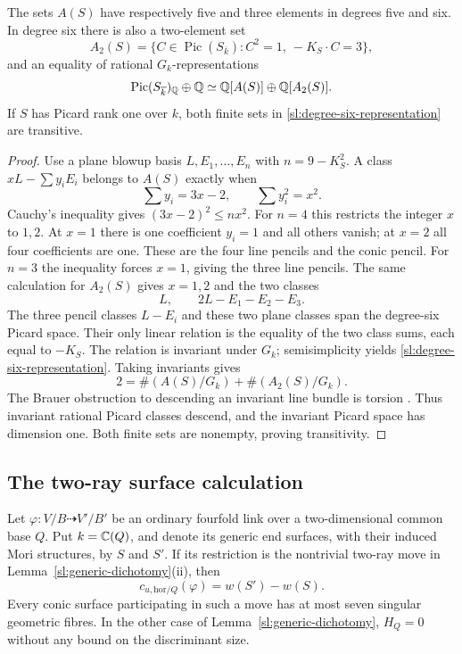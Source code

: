 \begin{lemma}\label{sl:pencil-sets}
The sets $A(S)$ have respectively five and three elements in degrees
five and six.  In degree six there is also a two-element set
\[
 A_2(S)=\{C\in\operatorname{Pic}(S_{\overline k}):
                  C^2=1,\ -K_S\cdot C=3\},
\]
and an equality of rational $G_k$-representations
\begin{equation}\label{sl:degree-six-representation}
 \operatorname{Pic}(S_{\overline k})_\mathbb Q\oplus\mathbb Q
       \simeq\mathbb Q[A(S)]\oplus\mathbb Q[A_2(S)].
\end{equation}
If $S$ has Picard rank one over $k$, both finite sets in
\eqref{sl:degree-six-representation} are transitive.
\end{lemma}

\begin{proof}
Use a plane blowup basis $L,E_1,\ldots,E_n$ with $n=9-K_S^2$.
A class $xL-\sum y_iE_i$ belongs to $A(S)$ exactly when
\[
 \sum y_i=3x-2,\qquad \sum y_i^2=x^2.
\]
Cauchy's inequality gives $(3x-2)^2\leq nx^2$.  For $n=4$ this restricts
the integer $x$ to $1,2$.  At $x=1$ there is one coefficient $y_i=1$
and all others vanish; at $x=2$ all four coefficients are one.  These
are the four line pencils and the conic pencil.  For $n=3$ the inequality
forces $x=1$, giving the three line pencils.  The same calculation for
$A_2(S)$ gives $x=1,2$ and the two classes
\[
 L,\qquad 2L-E_1-E_2-E_3.
\]
The three pencil classes $L-E_i$ and these two plane classes span the
degree-six Picard space.  Their only linear relation is the equality
of the two class sums, each equal to $-K_S$.  The relation is invariant
under $G_k$; semisimplicity yields \eqref{sl:degree-six-representation}.
Taking invariants gives
\[
 2=\#(A(S)/G_k)+\#(A_2(S)/G_k).
\]
The Brauer obstruction to descending an invariant line bundle is torsion
\cite[Remark~2.7]{AuelBernardara2018}. Thus invariant rational Picard
classes descend, and the invariant Picard space has dimension one.  Both finite
sets are nonempty, proving transitivity.
\end{proof}

\subsection{The two-ray surface calculation}
\label{sl:two-ray-calculation}

\begin{proposition}\label{sl:surface-identity}
Let $\varphi:V/B\dashrightarrow V'/B'$ be an ordinary fourfold link over a
two-dimensional common base $Q$.  Put $k=\mathbb C(Q)$, and denote its
generic end surfaces, with their induced Mori structures, by $S$ and
$S'$.  If its restriction is the nontrivial two-ray move in
Lemma~\ref{sl:generic-dichotomy}\textup{(ii)}, then
\begin{equation}\label{sl:surface-equation}
 c_{u,\mathrm{hor}/Q}(\varphi)=w(S')-w(S).
\end{equation}
Every conic surface participating in such a move has at most seven
singular geometric fibres.  In the other case of
Lemma~\ref{sl:generic-dichotomy}, $H_Q=0$ without any bound on the
discriminant size.
\end{proposition}

